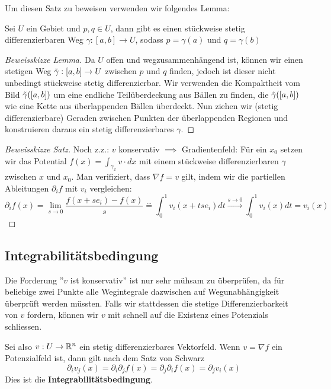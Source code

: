 Um diesen Satz zu beweisen verwenden wir folgendes Lemma:
\begin{lemma}{}{}
Sei $U$ ein Gebiet und $p,q \in U$, dann gibt es einen stückweise stetig differenzierbaren Weg $\gamma:[a,b]\to U$, sodass $p=\gamma(a)$ und $q = \gamma(b)$
\end{lemma}
\begin{proof}[Beweisskizze Lemma] Da $U$ offen und wegzusammenhängend ist, können wir einen stetigen Weg $\Tilde{\gamma}:[a,b] \to U$ zwischen $p$ und $q$ finden, jedoch ist dieser nicht unbedingt stückweise stetig differenzierbar. Wir verwenden die Kompaktheit vom Bild $\Tilde{\gamma}([a,b])$ um eine endliche Teilüberdeckung aus Bällen zu finden, die $\Tilde{\gamma}([a,b])$ wie eine Kette aus überlappenden Bällen überdeckt. Nun ziehen wir (stetig differenzierbare) Geraden zwischen Punkten der überlappenden Regionen und konstruieren daraus ein stetig differenzierbares $\gamma$.
\end{proof}
\begin{proof}[Beweisskizze Satz] Noch z.z.: $v$ konservativ $\implies$ Gradientenfeld:
Für ein $x_0$ setzen wir das Potential $f(x) = \int_{\gamma_x} v \cdot dx$ mit einem stückweise differenzierbaren $\gamma$ zwischen $x$ und $x_0$. Man verifiziert, dass $\nabla f = v$ gilt, indem wir die partiellen Ableitungen $\partial_if$ mit $v_i$ vergleichen:
$$\partial_if(x) = \lim_{s \to 0} \frac{f(x+se_i)-f(x)}{s} \stackrel{...}{=} \int_0^1v_i(x+tse_i) dt \stackrel{s \to 0}{\longrightarrow} \int_0^1v_i(x)dt = v_i(x)$$
\end{proof}

\subsection{Integrabilitätsbedingung}
Die Forderung ''$v$ ist konservativ'' ist nur sehr mühsam zu überprüfen, da für beliebige zwei Punkte alle Wegintegrale dazwischen auf Wegunabhängigkeit überprüft werden müssten. Falls wir stattdessen die stetige Differenzierbarkeit von $v$ fordern, können wir $v$ mit schnell auf die Existenz eines Potenzials schliessen.

Sei also $v:U \to \mathbb{R}^n$ ein stetig differenzierbares Vektorfeld. Wenn $v=\nabla f$ ein Potenzialfeld ist, dann gilt nach dem Satz von Schwarz
$$\partial_iv_j(x) = \partial_i\partial_jf(x)=\partial_j\partial_i f(x) = \partial_jv_i(x)$$
Dies ist die \textbf{Integrabilitätsbedingung}.

